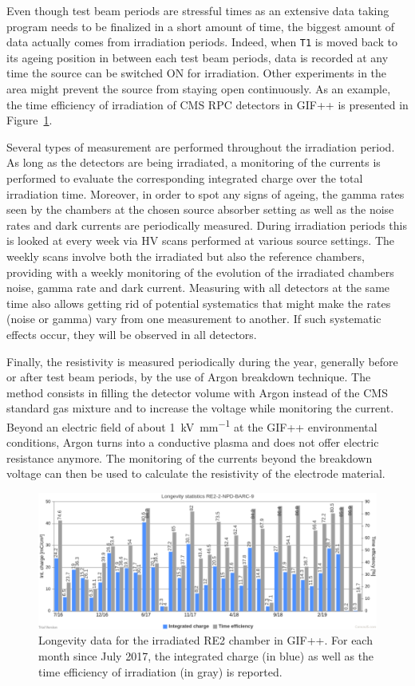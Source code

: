 	Even though test beam periods are stressful times as an extensive data taking program needs to be finalized in a short amount of time, the biggest amount of data actually comes from irradiation periods. Indeed, when \texttt{T1} is moved back to its ageing position in between each test beam periods, data is recorded at any time the source can be switched ON for irradiation. Other experiments in the area might prevent the source from staying open continuously. As an example, the time efficiency of irradiation of CMS RPC detectors in GIF++ is presented in Figure~\ref{fig:Irr-stat}.
	
	Several types of measurement are performed throughout the irradiation period. As long as the detectors are being irradiated, a monitoring of the currents is performed to evaluate the corresponding integrated charge over the total irradiation time. Moreover, in order to spot any signs of ageing, the gamma rates seen by the chambers at the chosen source absorber setting as well as the noise rates and dark currents are periodically measured. During irradiation periods this is looked at every week via HV scans performed at various source settings. The weekly scans involve both the irradiated but also the reference chambers, providing with a weekly monitoring of the evolution of the irradiated chambers noise, gamma rate and dark current. Measuring with all detectors at the same time also allows getting rid of potential systematics that might make the rates (noise or gamma) vary from one measurement to another. If such systematic effects occur, they will be observed in all detectors.
	
	Finally, the resistivity is measured periodically during the year, generally before or after test beam periods, by the use of Argon breakdown technique. The method consists in filling the detector volume with Argon instead of the CMS standard gas mixture and to increase the voltage while monitoring the current. Beyond an electric field of about \SI{1}{kV.mm^{-1}} at the GIF++ environmental conditions, Argon turns into a conductive plasma and does not offer electric resistance anymore. The monitoring of the currents beyond the breakdown voltage can then be used to calculate the resistivity of the electrode material.

	\begin{figure}[H]
        \centering
		\includegraphics[width = \linewidth]{fig/chapt5/GIFpp-irradiation-statistics.png}
		\caption{\label{fig:Irr-stat} Longevity data for the irradiated RE2 chamber in GIF++. For each month since July 2017, the integrated charge (in blue) as well as the time efficiency of irradiation (in gray) is reported.}
	\end{figure}
	
